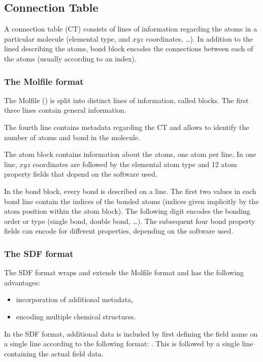 \subsection{Connection Table}

A connection table (CT) consists of lines of information regarding the atoms in a particular molecule (elemental type, and $xyz$ coordinates, \dots). In addition to the lined describing the atoms, bond block encodes the connections between each of the atoms (usually according to an index).

\subsubsection*{The Molfile format}

The Molfile () is split into distinct lines of information, called blocks. The first three lines contain general information.

The fourth line contains metadata regarding the CT and allows to identify the number of atoms and bond in the molecule.

The atom block contains information about the atoms, one atom per line. In one line, $xyz$ coordinates are followed by the elemental atom type and 12 atom property fields that depend on the software used.

In the bond block, every bond is described on a line. The first two values in each bond line contain the indices of the bonded atoms (indices given implicitly by the atom position within the atom block). The following digit encodes the bonding order or type (single bond, double bond, \dots). The subsequent four bond property fields can encode for different properties, depending on the software used.

\subsubsection*{The SDF format}

The SDF format wraps and extends the Molfile format and has the following advantages:
\begin{itemize}
    \item incorporation of additional metadata,
    \item encoding multiple chemical structures.
\end{itemize}

In the SDF format, additional data is included by first defining the field name on a single line according to the following format: . This is followed by a single line containing the actual field data.

